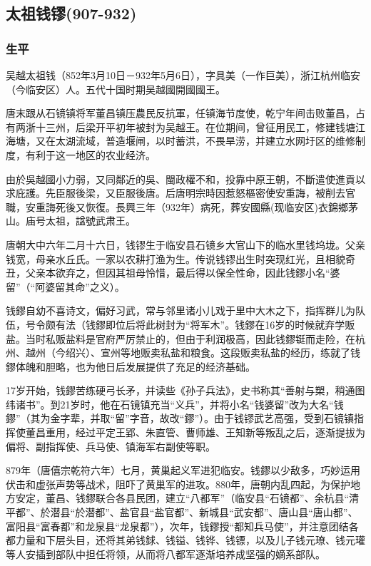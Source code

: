 
\subsection{太祖钱镠\tiny(907-932)}

\subsubsection{生平}

吴越太祖钱（852年3月10日－932年5月6日），字具美（一作巨美），浙江杭州临安（今临安区）人。五代十国时期吴越國開國國王。

唐末跟从石镜镇将军董昌镇压農民反抗軍，任镇海节度使，乾宁年间击败董昌，占有两浙十三州，后梁开平初年被封为吴越王。在位期间，曾征用民工，修建钱塘江海塘，又在太湖流域，普造堰闸，以时蓄洪，不畏旱涝，并建立水网圩区的维修制度，有利于这一地区的农业经济。

由於吳越國小力弱，又同鄰近的吳、閩政權不和，投靠中原王朝，不斷遣使進貢以求庇護。先臣服後梁，又臣服後唐。后唐明宗時因惹怒樞密使安重誨，被削去官職，安重誨死後又恢復。長興三年（932年）病死，葬安國縣(现临安区)衣錦鄉茅山。庙号太祖，諡號武肃王。

唐朝大中六年二月十六日，钱镠生于临安县石镜乡大官山下的临水里钱坞垅。父亲钱宽，母亲水丘氏。一家以农耕打渔为生。传说钱镠出生时突现红光，且相貌奇丑，父亲本欲弃之，但因其祖母怜惜，最后得以保全性命，因此钱鏐小名“婆留”（“阿婆留其命”之义）。

钱鏐自幼不喜诗文，偏好习武，常与邻里诸小儿戏于里中大木之下，指挥群儿为队伍，号令颇有法（钱鏐即位后将此树封为“将军木”。钱鏐在16岁的时候就弃学贩盐。当时私贩盐料是官府严厉禁止的，但由于利润极高，因此钱鏐铤而走险，在杭州、越州（今绍兴）、宣州等地贩卖私盐和粮食。这段贩卖私盐的经历，练就了钱鏐体魄和胆略，也为他日后发展提供了充足的经济基础。

17岁开始，钱鏐苦练硬弓长矛，并读些《孙子兵法》，史书称其“善射与槊，稍通图纬诸书”。到21岁时，他在石镜镇充当“义兵”，并将小名“钱婆留”改为大名“钱鏐”（其为金字辈，并取“留”字音，故改“鏐”）。由于钱镠武艺高强，受到石镜镇指挥使董昌重用，经过平定王郢、朱直管、曹师雄、王知新等叛乱之后，逐渐提拔为偏将、副指挥使、兵马使、镇海军右副使等职。

879年（唐僖宗乾符六年）七月，黄巢起义军进犯临安。钱鏐以少敌多，巧妙运用伏击和虚张声势等战术，阻吓了黄巢军的进攻。880年，唐朝内乱四起，为保护地方安定，董昌、钱鏐联合各县民团，建立“八都军”（临安县“石镜都”、余杭县“清平都”、於潜县“於潜都”、盐官县“盐官都”、新城县“武安都”、唐山县“唐山都”、富阳县“富春都”和龙泉县“龙泉都”），次年，钱鏐授“都知兵马使”，并注意团结各都力量和下层头目，还将其弟钱銶、钱镒、钱铧、钱镖，以及儿子钱元璙、钱元瓘等人安插到部队中担任将领，从而将八都军逐渐培养成坚强的嫡系部队。

